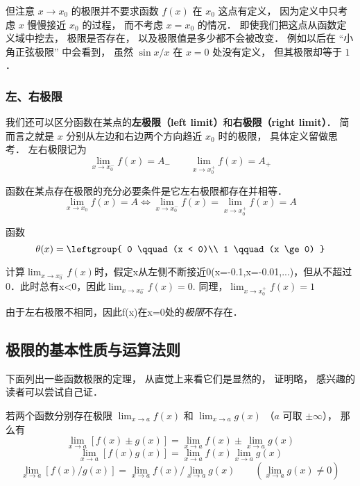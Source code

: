 但注意 $x\to x_0$ 的极限并不要求函数 $f(x)$ 在 $x_0$ 这点有定义， 因为定义中只考虑 $x$ 慢慢接近 $x_0$ 的过程， 而不考虑 $x = x_0$ 的情况． 即使我们把这点从函数定义域中挖去， 极限是否存在， 以及极限值是多少都不会被改变． 例如以后在 “小角正弦极限” 中会看到， 虽然 $\sin x/ x$ 在 $x = 0$ 处没有定义， 但其极限却等于 $1$．

\subsubsection{左、右极限}
我们还可以区分函数在某点的\textbf{左极限（left limit）}和\textbf{右极限（right limit）}． 简而言之就是 $x$ 分别从左边和右边两个方向趋近 $x_0$ 时的极限， 具体定义留做思考． 左右极限记为
\begin{equation}
\lim_{x\to x_0^-} f(x) = A_- \qquad \lim_{x\to x_0^+} f(x) = A_+
\end{equation}

\begin{theorem}{}
函数在某点存在极限的充分必要条件是它左右极限都存在并相等．
$$\lim_{x\to x_0} f(x) = A \Leftrightarrow \lim_{x\to x_0^-} f(x) = \lim_{x\to x_0^+} f(x) = A $$
\end{theorem}

\begin{example}{}
函数
\begin{equation}
\theta(x) = \leftgroup{
0 \qquad (x < 0)\\
1 \qquad (x \ge 0)
}\end{equation}

计算$\lim_{x\to x_0^-} f(x)$时，假定x从左侧不断接近0(x=-0.1,x=-0.01,...)，但从不超过0．此时总有x<0，因此$\lim_{x\to x_0^-} f(x) = 0$. 同理，$\lim_{x\to x_0^+} f(x) = 1$

由于左右极限不相同，因此f(x)在x=0处的\textsl{极限}不存在．
\end{example}






\subsection{极限的基本性质与运算法则}
下面列出一些函数极限的定理， 从直觉上来看它们是显然的， 证明略， 感兴趣的读者可以尝试自己证．
\begin{theorem}{}
若两个函数分别存在极限 $\lim_{x\to a} f(x)$ 和 $\lim_{x\to a} g(x)$ （$a$ 可取 $\pm \infty$）， 那么有
\begin{equation}
\lim_{x\to a} [f(x) \pm g(x)] = \lim_{x\to a}f(x) \pm  \lim_{x\to a} g(x)
\end{equation}
\begin{equation}
\lim_{x\to a} [f(x) g(x)] = \lim_{x\to a}f(x) \lim_{x\to a} g(x)
\end{equation}
\begin{equation}
\lim_{x\to a} [f(x)/g(x)] = \lim_{x\to a}f(x)/\lim_{x\to a} g(x) \qquad (\lim_{x\to a} g(x) \ne 0)
\end{equation}
\end{theorem}

